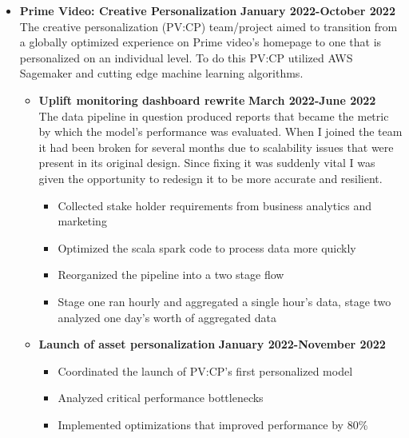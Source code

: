 \documentclass[overlapped]{res}
\begin{document}
\begin{resume}
\begin{itemize}[leftmargin=0in]
\begin{itemize}
\begin{itemize}
        \end{itemize}
        \vspace{0.125in}
    \end{itemize}
    \vspace{0.125in}
    \item[]
    \textbf{Prime Video: Creative Personalization} \hfill \textbf{January 2022-October 2022} \\
    The creative personalization (PV:CP) team/project aimed to transition from a globally optimized experience on Prime video's homepage to one that is personalized on an individual level.
    To do this PV:CP utilized AWS Sagemaker and cutting edge machine learning algorithms.
    \begin{itemize}
        \item[]
        \textbf{Uplift monitoring dashboard rewrite} \hfill \textbf{March 2022-June 2022} \\
        The data pipeline in question produced reports that became the metric by which the model's performance was evaluated. 
        When I joined the team it had been broken for several months due to scalability issues that were present in its original design.
        Since fixing it was suddenly vital I was given the opportunity to redesign it to be more accurate and resilient. 
        \begin{itemize}
            \item[\textbullet] Collected stake holder requirements from business analytics and marketing
            \item[\textbullet] Optimized the scala spark code to process data more quickly
            \item[\textbullet] Reorganized the pipeline into a two stage flow
            \item[\textbullet] Stage one ran hourly and aggregated a single hour's data, stage two analyzed one day's worth of aggregated data
        \end{itemize}
        \vspace{0.125in}
        \item[]
        \textbf{Launch of asset personalization} \hfill \textbf{January 2022-November 2022} \\
        \begin{itemize}
            \item[\textbullet] Coordinated the launch of PV:CP's first personalized model
            \item[\textbullet] Analyzed critical performance bottlenecks 
            \item[\textbullet] Implemented optimizations that improved performance by 80\%
        \end{itemize}
        \vspace{0.125in}
    \end{itemize}
    \vspace{0.125in}


\end{itemize}
\end{resume}
\end{document}

